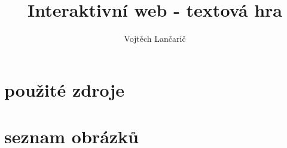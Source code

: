 \documentclass{article}
\title{Interaktivní web - textová hra}
\author{Vojtěch Lančarič}
\begin{document}
\maketitle

\newpage %

\newpage

\newpage



\newpage


\newpage

\newpage





\newpage

\section{použité zdroje}

\newpage
\section{seznam obrázků}
\end{document}
